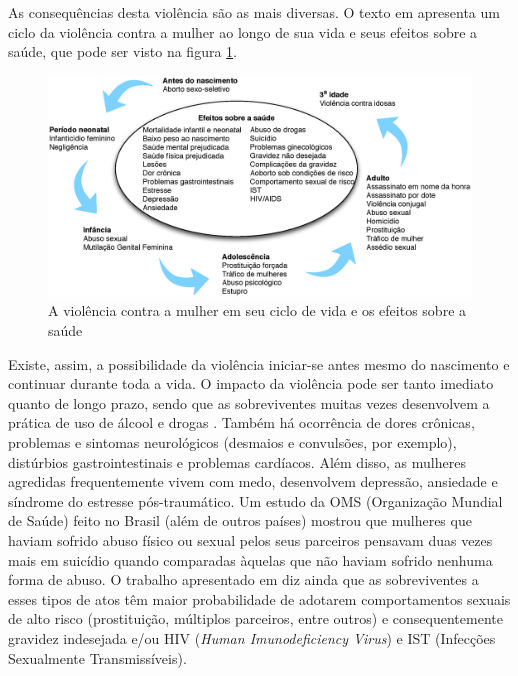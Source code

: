 \documentclass[12pt]{article}
\begin{document}
As consequências desta violência são as mais diversas. O texto em
\cite{outlook1} apresenta um ciclo da violência contra a mulher ao
longo de sua vida e
seus efeitos sobre a saúde, que pode ser visto na figura \ref{fig:ciclov}.
\begin{figure}[ht]
  \centering
  \includegraphics[width=\linewidth]{cicloviolencia}
  \caption{A violência contra a mulher em seu ciclo de vida e os
    efeitos sobre a saúde \label{fig:ciclov}}
\end{figure}
Existe, assim, a possibilidade da violência iniciar-se antes mesmo do
nascimento e continuar durante toda a vida. O impacto da violência
pode ser tanto imediato quanto de longo prazo, sendo que as
sobreviventes muitas vezes desenvolvem a prática de uso de álcool e
drogas \cite{outlook1}. Também há ocorrência de dores crônicas,
problemas e sintomas neurológicos (desmaios e convulsões, por
exemplo), distúrbios gastrointestinais e problemas cardíacos. Além
disso, as mulheres agredidas frequentemente vivem com medo,
desenvolvem depressão, ansiedade e síndrome do estresse
pós-traumático. Um estudo da OMS (Organização Mundial de Saúde) feito
no Brasil (além de outros países) mostrou que mulheres que haviam
sofrido abuso físico ou sexual pelos seus parceiros pensavam duas
vezes mais em suicídio quando comparadas àquelas que não haviam sofrido
nenhuma forma de abuso. O trabalho apresentado em \cite{hopkins1} diz
ainda que as sobreviventes a esses tipos de atos têm maior
probabilidade de adotarem comportamentos sexuais de alto risco
(prostituição, múltiplos parceiros, entre outros) e consequentemente
gravidez indesejada e/ou HIV (\textit{Human Imunodeficiency Virus}) e
IST (Infecções Sexualmente Transmissíveis).
\end{document}
